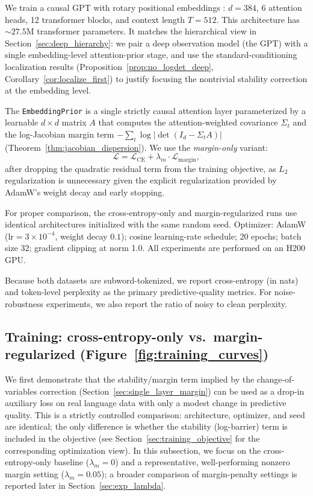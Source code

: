 \documentclass[11pt]{article}
\begin{document}
We train a causal GPT with rotary positional embeddings \citep{su2021roformer}: $d{=}384$, 6 attention heads, 12 transformer blocks, and context length $T{=}512$.
This architecture has ${\sim}27.5\mathrm{M}$ transformer parameters. 
It matches the hierarchical view in Section~\ref{sec:deep_hierarchy}: we pair a deep observation model (the GPT) with a single embedding-level attention-prior stage, and use the standard-conditioning localization results (Proposition~\ref{prop:no_logdet_deep}, Corollary~\ref{cor:localize_first}) to justify focusing the nontrivial stability correction at the embedding level.

The \texttt{EmbeddingPrior} is a single strictly causal attention layer
parameterized by a learnable $d{\times}d$ matrix $A$ that computes the
attention-weighted covariance $\Sigma_t$ and the log-Jacobian margin term
$-\sum_t \log|\det(I_d-\Sigma_t A)|$
(Theorem~\ref{thm:jacobian_dispersion}). We use the \emph{margin-only} variant:
\[
\mathcal{L} = \mathcal{L}_{\mathrm{CE}} + \lambda_m \cdot
\mathcal{L}_{\mathrm{margin}},
\]
after dropping the quadratic residual term from the training objective, as $L_2$ regularization is unnecessary given the explicit regularization provided by AdamW's weight decay and early stopping.

For proper comparison, the cross-entropy-only and margin-regularized runs use identical architectures initialized with the same random seed.
Optimizer: AdamW ($\mathrm{lr}{=}3\times10^{-4}$, weight decay $0.1$); cosine learning-rate schedule; 20 epochs; batch size 32; gradient clipping at norm 1.0. 
All experiments are performed on an H200 GPU.

Because both datasets are subword-tokenized, we report cross-entropy (in nats)
and token-level perplexity as the primary predictive-quality metrics. For
noise-robustness experiments, we also report the ratio of noisy to clean
perplexity.

\subsection{Training: cross-entropy-only vs.\ margin-regularized (Figure~\ref{fig:training_curves})}
\label{sec:exp_training}

We first demonstrate that the stability/margin term implied by the change-of-variables correction (Section~\ref{sec:single_layer_margin}) can be used as a drop-in auxiliary loss on real language data with only a modest change in predictive quality. 
This is a strictly controlled comparison: architecture, optimizer, and seed are identical; the only difference is whether the stability (log-barrier) term is included in the objective (see Section~\ref{sec:training_objective} for the corresponding optimization view). 
In this subsection, we focus on the cross-entropy-only baseline ($\lambda_m=0$) and a representative, well-performing nonzero margin setting ($\lambda_m=0.05$); a broader comparison of margin-penalty settings is reported later in Section~\ref{sec:exp_lambda}.
\end{document}
